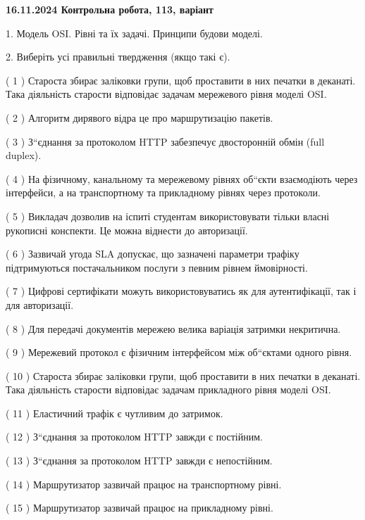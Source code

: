 \documentclass[12pt, ukrainian]{article}
\begin{document}
\vspace{4mm}
\newpage
\begin {large}

\textbf{16.11.2024 Контрольна робота, 113, варіант  }\par


{
1. Модель OSI. Рівні та їх задачі. Принципи будови моделі.



\vspace{5mm}
2. Виберіть усі правильні твердження (якщо такі є).\par
\vspace{2mm}

( 1 ) Староста збирає заліковки групи, щоб проставити в них печатки в деканаті. Така діяльність старости відповідає задачам мережевого рівня моделі OSI.

( 2 ) Алгоритм дирявого відра це про маршрутизацію пакетів.

( 3 ) З“єднання за протоколом  HTTP забезпечує двосторонній обмін (full duplex).

( 4 ) На фізичному, канальному та мережевому рівнях об“єкти взаємодіють через інтерфейси, а на транспортному та прикладному рівнях через протоколи.

( 5 ) Викладач дозволив на іспиті студентам використовувати тільки власні рукописні конспекти. Це можна віднести до авторизації.

( 6 ) Зазвичай угода  SLA допускає, що зазначені параметри трафіку підтримуються постачальником послуги з певним рівнем ймовірності.

( 7 ) Цифрові сертифікати можуть використовуватись як для аутентифікації, так і для авторизації.

( 8 ) Для передачі документів мережею велика варіація затримки некритична.

( 9 ) Мережевий протокол є фізичним інтерфейсом між об“єктами одного рівня.

( 10 ) Староста збирає заліковки групи, щоб проставити в них печатки в деканаті. Така діяльність старости відповідає задачам прикладного рівня моделі OSI.

( 11 ) Еластичний трафік є чутливим до затримок.

( 12 ) З“єднання за протоколом  HTTP завжди є постійним.

( 13 ) З“єднання за протоколом  HTTP завжди є непостійним.

( 14 ) Маршрутизатор зазвичай працює на транспортному рівні.

( 15 ) Маршрутизатор зазвичай працює на прикладному рівні.
}
\end {large}
\end{document}
